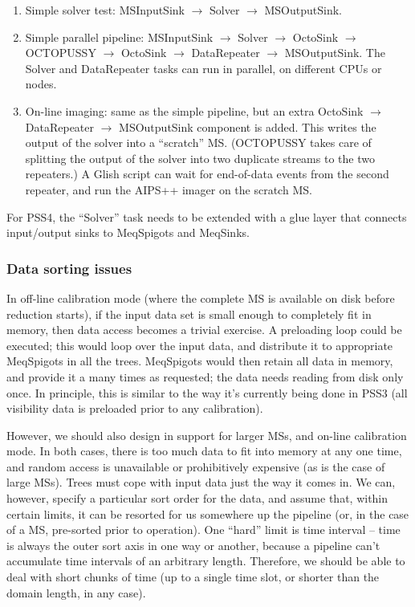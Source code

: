 \documentclass[12pt]{article}
\begin{document}
  \begin{enumerate}
  
  \item Simple solver test: MSInputSink $\rightarrow$ Solver $\rightarrow$
  MSOutputSink.
  
  \item Simple parallel pipeline: MSInputSink $\rightarrow$ Solver
  $\rightarrow$ OctoSink $\rightarrow$ OCTOPUSSY $\rightarrow$ OctoSink 
  $\rightarrow$ DataRepeater $\rightarrow$ MSOutputSink. The Solver and
  DataRepeater tasks can run in parallel, on different CPUs or nodes.

  \item On-line imaging: same as the simple pipeline, but an extra OctoSink
  $\rightarrow$ DataRepeater $\rightarrow$ MSOutputSink component is added.
  This writes the output of the solver into a ``scratch'' MS. (OCTOPUSSY takes
  care of splitting the output of the solver into two duplicate streams to the
  two repeaters.) A Glish script can wait for end-of-data events from the
  second repeater, and run the AIPS++ imager on the scratch MS.

  \end{enumerate}
  
  For PSS4, the ``Solver'' task needs to be extended with a glue layer that
  connects input/output sinks to MeqSpigots and MeqSinks.

\subsubsection{Data sorting issues}

  In off-line calibration mode (where the complete MS is available on disk
  before reduction starts), if the input data set is small enough to completely
  fit in memory, then data access becomes a trivial exercise. A preloading loop
  could be executed; this would loop over the input data, and distribute it to
  appropriate MeqSpigots in all the trees. MeqSpigots would then retain all
  data in memory, and provide it a many times as requested; the data needs
  reading from disk only once. In principle, this is similar to the way it's
  currently being done in PSS3 (all visibility data is preloaded prior to any
  calibration).

  However, we should also design in support for larger MSs, and on-line
  calibration mode. In both cases, there is too much data to fit into memory at
  any one time, and random access is unavailable or prohibitively expensive (as
  is the case of large MSs). Trees must cope with input data just the way it
  comes in. We can, however, specify a particular sort order for the data, and
  assume that, within certain limits, it can be resorted for us somewhere up
  the pipeline (or, in the case of a MS, pre-sorted prior to operation). One
  ``hard'' limit is time interval -- time is always the outer sort axis in one
  way or another, because a pipeline can't accumulate time intervals of an
  arbitrary length. Therefore, we should be able to deal with short chunks of
  time (up to a single time slot, or shorter than the domain length, in any
  case).
\end{document}
